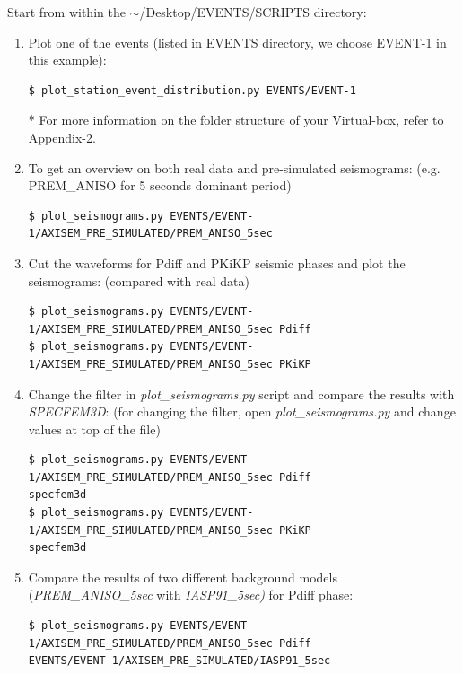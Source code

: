 \documentclass{article}
\begin{document}
Start from within the $\sim$/Desktop/EVENTS/SCRIPTS directory:

\begin{enumerate}
\item Plot one of the events (listed in EVENTS directory, we choose EVENT-1 in this example):

\begin{lstlisting}
$ plot_station_event_distribution.py EVENTS/EVENT-1
\end{lstlisting}
* For more information on the folder structure of your Virtual-box, refer to Appendix-2.

\item To get an overview on both real data and pre-simulated seismograms: (e.g. PREM\_ANISO 
for 5 seconds dominant period)
\begin{lstlisting}
$ plot_seismograms.py EVENTS/EVENT-1/AXISEM_PRE_SIMULATED/PREM_ANISO_5sec
\end{lstlisting}

\item Cut the waveforms for Pdiff and PKiKP seismic phases and plot the seismograms: 
(compared with real data)
\begin{lstlisting}
$ plot_seismograms.py EVENTS/EVENT-1/AXISEM_PRE_SIMULATED/PREM_ANISO_5sec Pdiff
$ plot_seismograms.py EVENTS/EVENT-1/AXISEM_PRE_SIMULATED/PREM_ANISO_5sec PKiKP
\end{lstlisting}

\item Change the filter in \textit{plot\_seismograms.py} script and compare the results with 
\textit{SPECFEM3D}: (for changing the filter, open \textit{plot\_seismograms.py} and change 
values at top of the file)

\begin{lstlisting}
$ plot_seismograms.py EVENTS/EVENT-1/AXISEM_PRE_SIMULATED/PREM_ANISO_5sec Pdiff 
specfem3d
$ plot_seismograms.py EVENTS/EVENT-1/AXISEM_PRE_SIMULATED/PREM_ANISO_5sec PKiKP 
specfem3d
\end{lstlisting}

\item Compare the results of two different background models (\textit{PREM\_ANISO\_5sec} with 
\textit{IASP91\_5sec)} for Pdiff phase:

\begin{lstlisting}
$ plot_seismograms.py EVENTS/EVENT-1/AXISEM_PRE_SIMULATED/PREM_ANISO_5sec Pdiff 
EVENTS/EVENT-1/AXISEM_PRE_SIMULATED/IASP91_5sec
\end{lstlisting}


\end{enumerate}
\end{document}
